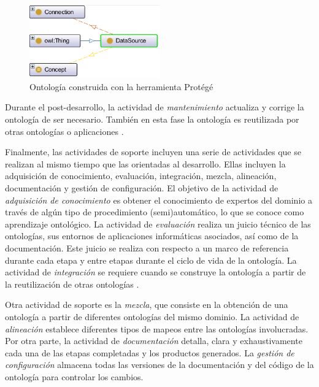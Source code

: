 \begin{figure}
\begin{center}
	\includegraphics[width=0.5\textwidth]{img/ontologiaProtege.png}
\end{center}
\caption{Ontología construida con la herramienta Protégé}
\label{fig: ontologiaProtege}
\end{figure}

Durante el post-desarrollo, la actividad de \textit{mantenimiento} actualiza y corrige la ontología de ser necesario. También en esta fase la ontología es reutilizada por otras ontologías o aplicaciones \citep{Gomez-Perez:2007:OEE:1199560}.

Finalmente, las actividades de soporte incluyen una serie de actividades que se realizan al mismo tiempo que las orientadas al desarrollo. Ellas incluyen la adquisición de conocimiento, evaluación, integración, mezcla, alineación, documentación y gestión de configuración. El objetivo de la actividad de \textit{adquisición de conocimiento} es obtener el conocimiento de expertos del dominio a través de algún tipo de procedimiento (semi)automático, lo que se conoce como aprendizaje ontológico. La actividad de \textit{evaluación} realiza un juicio técnico de las ontologías, sus entornos de aplicaciones informáticas asociados, así como de la documentación. Este juicio se realiza con respecto a un marco de referencia durante cada etapa y entre etapas durante el ciclo de vida de la ontología. La actividad de \textit{integración} se requiere cuando se construye la ontología a partir de la reutilización de otras ontologías \citep{Gomez-Perez:2007:OEE:1199560}.

Otra actividad de soporte es la \textit{mezcla}, que consiste en la obtención de una ontología a partir de diferentes ontologías del mismo dominio. La actividad de \textit{alineación} establece diferentes tipos de mapeos entre las ontologías  involucradas. Por otra parte, la actividad de \textit{documentación} detalla, clara y exhaustivamente cada una de las etapas completadas y los productos generados. La \textit{gestión de configuración} almacena todas las versiones de la documentación y del código de la ontología para controlar los cambios.

